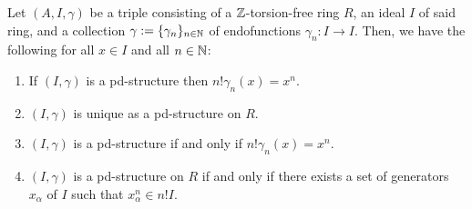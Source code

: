                 \begin{proposition}
                    Let $(A, I, \gamma)$ be a triple consisting of a $\mathbb{Z}$-torsion-free ring $R$, an ideal $I$ of said ring, and a collection $\gamma := \{\gamma_n\}_{n \in \mathbb{N}}$ of endofunctions $\gamma_n: I \to I$. Then, we have the following for all $x \in I$ and all $n \in \mathbb{N}$:
                        \begin{enumerate}
                            \item If $(I, \gamma)$ is a pd-structure then $n! \gamma_n(x) = x^n$.
                            \item $(I, \gamma)$ is unique as a pd-structure on $R$.
                            \item $(I, \gamma)$ is a pd-structure if and only if $n! \gamma_n(x) = x^n$. 
                            \item $(I, \gamma)$ is a pd-structure on $R$ if and only if there exists a set of generators $x_{\alpha}$ of $I$ such that $x_{\alpha}^n \in n! I$. 
                        \end{enumerate}
                \end{proposition}
